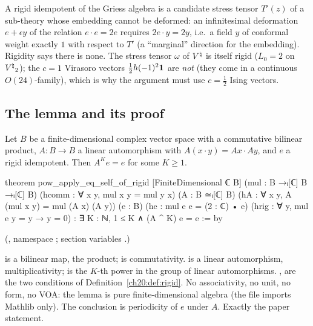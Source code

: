 \begin{physics}
A rigid idempotent of the Griess algebra is a candidate stress tensor $T'(z)$ of a sub-theory whose embedding cannot be
deformed: an infinitesimal deformation $e+\epsilon y$ of the relation $e\cdot e=2e$ requires $2e\cdot y=2y$, i.e.\ a field
$y$ of conformal weight exactly $1$ with respect to $T'$ (a ``marginal'' direction for the embedding).  Rigidity says there
is none.  The stress tensor $\omega$ of ${V^{\natural}}$ is itself rigid ($L_0=2$ on ${V^{\natural}}_2$); the $c=1$ Virasoro vectors
$\tfrac12h(-1)^2\mathbf 1$ are \emph{not} (they come in a continuous $O(24)$-family), which is why the argument must
use $c=\tfrac12$ Ising vectors.
\end{physics}

\subsection{The lemma and its proof}

\begin{theorem}\label{ch20:thm:periodic}
Let $B$ be a finite-dimensional complex vector space with a commutative bilinear product, $A:B\to B$ a linear
automorphism with $A(x\cdot y)=Ax\cdot Ay$, and $e$ a rigid idempotent.  Then $A^Ke=e$ for some $K\ge1$.
\end{theorem}
\begin{leancode}
theorem pow_apply_eq_self_of_rigid [FiniteDimensional ℂ B]
    (mul : B →ₗ[ℂ] B →ₗ[ℂ] B) (hcomm : ∀ x y, mul x y = mul y x)
    (A : B ≃ₗ[ℂ] B) (hA : ∀ x y, A (mul x y) = mul (A x) (A y))
    (e : B) (he : mul e e = (2 : ℂ) • e)
    (hrig : ∀ y, mul e y = y → y = 0) :
    ∃ K : ℕ, 1 ≤ K ∧ (A ^ K) e = e := by
\end{leancode}
(, namespace ; section
variables .)
\begin{dictionary}
 is a bilinear map, the product;  is commutativity.   is a linear
automorphism,  multiplicativity;  is the $K$-th power in the group of linear automorphisms.
,  are the two conditions of Definition~\ref{ch20:def:rigid}.  No associativity, no unit, no
form, no VOA: the lemma is pure finite-dimensional algebra (the file imports Mathlib only).  The conclusion
 is periodicity of $e$ under $A$.  Exactly the paper statement.
\end{dictionary}

